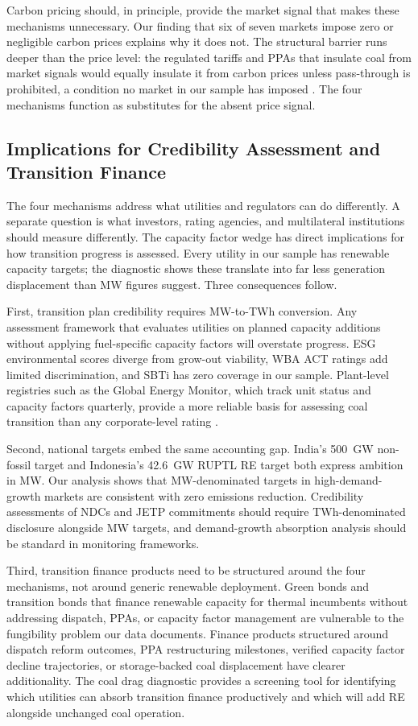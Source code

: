 \documentclass[review,3p,authoryear]{elsarticle}
\begin{document}
Carbon pricing should, in principle, provide the market signal that makes these mechanisms unnecessary. Our finding that six of seven markets impose zero or negligible carbon prices explains why it does not. The structural barrier runs deeper than the price level: the regulated tariffs and PPAs that insulate coal from market signals would equally insulate it from carbon prices unless pass-through is prohibited, a condition no market in our sample has imposed \citep{Boute2017,Acworth2020}. The four mechanisms function as substitutes for the absent price signal.

\subsection{Implications for Credibility Assessment and Transition Finance}

The four mechanisms address what utilities and regulators can do differently. A separate question is what investors, rating agencies, and multilateral institutions should measure differently. The capacity factor wedge has direct implications for how transition progress is assessed. Every utility in our sample has renewable capacity targets; the diagnostic shows these translate into far less generation displacement than MW figures suggest. Three consequences follow.

First, transition plan credibility requires MW-to-TWh conversion. Any assessment framework that evaluates utilities on planned capacity additions without applying fuel-specific capacity factors will overstate progress. ESG environmental scores diverge from grow-out viability, WBA ACT ratings add limited discrimination, and SBTi has zero coverage in our sample. Plant-level registries such as the Global Energy Monitor, which track unit status and capacity factors quarterly, provide a more reliable basis for assessing coal transition than any corporate-level rating \citep{Duchin2025,Jiang2025,Berg2022}.

Second, national targets embed the same accounting gap. India's 500~GW non-fossil target and Indonesia's 42.6~GW RUPTL RE target both express ambition in MW. Our analysis shows that MW-denominated targets in high-demand-growth markets are consistent with zero emissions reduction. Credibility assessments of NDCs and JETP commitments should require TWh-denominated disclosure alongside MW targets, and demand-growth absorption analysis should be standard in monitoring frameworks.

Third, transition finance products need to be structured around the four mechanisms, not around generic renewable deployment. Green bonds and transition bonds that finance renewable capacity for thermal incumbents without addressing dispatch, PPAs, or capacity factor management are vulnerable to the fungibility problem our data documents. Finance products structured around dispatch reform outcomes, PPA restructuring milestones, verified capacity factor decline trajectories, or storage-backed coal displacement have clearer additionality. The coal drag diagnostic provides a screening tool for identifying which utilities can absorb transition finance productively and which will add RE alongside unchanged coal operation.
\end{document}
